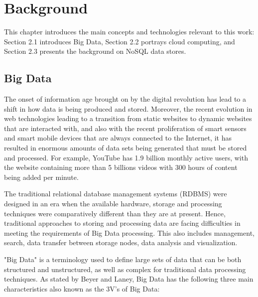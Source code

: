 
\chapter{Background}

This chapter introduces the main concepts and technologies relevant to this work: Section 2.1 introduces Big Data, Section 2.2 portrays cloud computing, and Section 2.3 presents the background on NoSQL data stores.

\section{Big Data}

The onset of information age brought on by the digital revolution has lead to a shift in how data is being produced and stored. Moreover, the recent evolution in web technologies leading to a transition from static websites to dynamic websites that are interacted with, and also with the recent proliferation of smart sensors and smart mobile devices that are always connected to the Internet, it has resulted in enormous amounts of data sets being generated that must be stored and processed. For example, YouTube has 1.9 billion monthly active users, with the website containing more than 5 billions videos with 300 hours of content being added per minute.

The traditional relational database management systems (RDBMS) were designed in an era when the available hardware, storage and processing techniques were comparatively different than they are at present. Hence, traditional approaches to storing and processing data are facing difficulties in meeting the requirements of Big Data processing. This also includes management, search, data transfer between storage nodes, data analysis and visualization.

"Big Data" is a terminology used to define large sets of data that can be both structured and unstructured, as well as complex for traditional data processing techniques. As stated by Beyer and Laney, Big Data has the following three main characteristics also known as the 3V's of Big Data:


